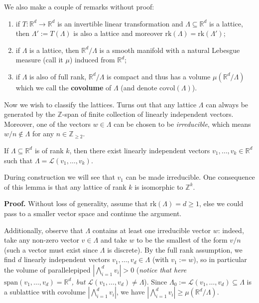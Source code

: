 \documentclass{template-2}
\begin{document}
We also make a couple of remarks without proof:
\begin{enumerate}
    \item[(a)] if $T: \mathbb{R}^d \to \mathbb{R}^d$ is an invertible linear
    transformation and $\Lambda \subseteq \mathbb{R}^d$ is a lattice, then
    $\Lambda' := T(\Lambda)$ is also a lattice and moreover
    $\text{rk}(\Lambda) = \text{rk}(\Lambda')$;
    \item[(b)] if $\Lambda$ is a lattice, then $\mathbb{R}^d/\Lambda$ is a
    smooth manifold with a natural Lebesgue measure (call it $\mu$) induced
    from $\mathbb{R}^d$;
    \item[(c)] if $\Lambda$ is also of full rank, $\mathbb{R}^d/\Lambda$ is
    compact and thus has a volume $\mu(\mathbb{R}^d/\Lambda)$ which we call
    the \textbf{covolume} of $\Lambda$ (and denote $\text{covol}(\Lambda)$).
\end{enumerate}

Now we wish to classify the lattices. Turns out that any lattice $\Lambda$ can
always be generated by the $\mathbb{Z}$-span of finite collection of linearly
independent vectors. Moreover, one of the vectors $w \in \Lambda$ can be chosen
to be \textit{irreducible}, which means $w/n \not\in\Lambda$ for any $n \in
\mathbb{Z}_{\geq 2}$.

\begin{lemma}\label{fundamental-lemma}
    If $\Lambda \subseteq \mathbb{R}^d$ is of rank $k$, then there exist
    linearly independent vectors $v_1,\dots,v_k \in \mathbb{R}^d$ such
    that $\Lambda=\mathcal{L}(v_1,\dots,v_k)$.
\end{lemma}

During construction we will see that $v_1$ can be made
irreducible. One consequence of this lemma is that any lattice of rank $k$ is
isomorphic to $\mathbb{Z}^k$.

\textbf{Proof.} Without loss of generality, assume that $\text{rk}(\Lambda)=d
\geq 1$, else we could pass to a smaller vector space and continue the argument. 

Additionally, observe that $\Lambda$ contains at least one irreducible vector
$w$: indeed, take any non-zero vector $v \in \Lambda$ and take $w$ to be the
smallest of the form $v/n$ (such a vector must exist since $\Lambda$ is
discrete). By the full rank assumption, we find $d$ linearly independent vectors
$v_1,\dots,v_d \in \Lambda$ (with $v_1 := w$), so in particular the volume of
parallelepiped $|\bigwedge_{i=1}^d v_i| > 0$ (\textit{notice that here
$\text{span}(v_1,\dots,v_d)=\mathbb{R}^d$, but $\mathcal{L}(v_1,\dots,v_d) \neq
\Lambda$}). Since $\Lambda_0 := \mathcal{L}(v_1,\dots,v_d) \subseteq \Lambda$ is a sublattice
with covolume $|\bigwedge_{i=1}^d v_i|$, we have $|\bigwedge_{i=1}^d v_i| \geq
\mu(\mathbb{R}^d/\Lambda)$. 
\end{document}
